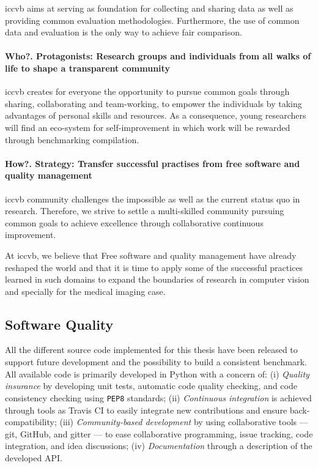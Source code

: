 \Ac{iccvb} aims at serving as foundation for collecting and sharing data as well as providing common evaluation methodologies.
Furthermore, the use of common data and evaluation is the only way to achieve fair comparison.

\paragraph{Who?. Protagonists: Research groups and individuals from all walks of life to shape a transparent community}
\Ac{iccvb} creates for everyone the opportunity to pursue common goals through sharing, collaborating and team-working, to empower the individuals by taking advantages of personal skills and resources.
As a consequence, young researchers will find an eco-system for self-improvement in which work will be rewarded through benchmarking compilation.

\paragraph{How?. Strategy: Transfer successful practises from free software and quality management}
\Ac{iccvb} community challenges the impossible as well as the current status quo in research.
Therefore, we strive to settle a multi-skilled community pursuing common goals to achieve excellence through collaborative continuous improvement.

At \ac{iccvb}, we believe that Free software and quality management have already reshaped the world and that it is time to apply some of the successful practices learned in such domains to expand the boundaries of research in computer vision and specially for the medical imaging case.

\subsection{Software Quality}

All the different source code implemented for this thesis have been released to support future development and the possibility to build a consistent benchmark.
All available code is primarily developed in Python with a concern of:
(i) \emph{Quality insurance} by developing unit tests, automatic code quality checking, and code consistency checking using \texttt{PEP8} standards;
(ii) \emph{Continuous integration} is achieved through tools as Travis CI to easily integrate new contributions and ensure back-compatibility;
(iii) \emph{Community-based development} by using collaborative tools --- git, GitHub, and gitter --- to ease collaborative programming, issue tracking, code integration, and idea discussions;
(iv) \emph{Documentation} through a description of the developed API.


